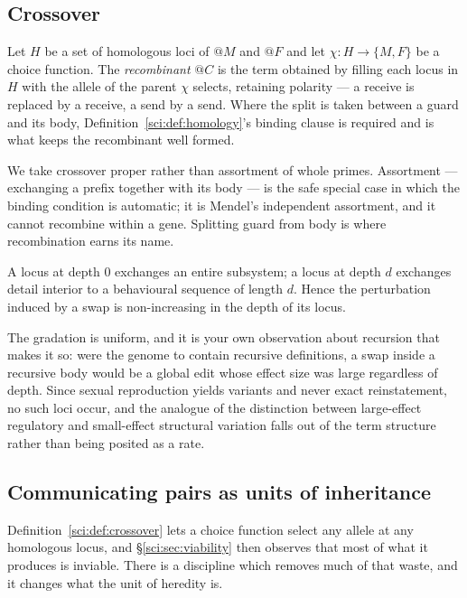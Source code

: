\subsection{Crossover}\label{sci:S12.4}

\begin{definition}[Crossover]
\label{sci:def:crossover}
Let $H$ be a set of homologous loci of $@M$ and $@F$ and let $\chi : H \to \{M, F\}$ be a choice
function. The \emph{recombinant} $@C$ is the term obtained by filling each locus in $H$ with the
allele of the parent $\chi$ selects, retaining polarity --- a receive is replaced by a receive, a send
by a send. Where the split is taken between a guard and its body, Definition~\ref{sci:def:homology}'s
binding clause is required and is what keeps the recombinant well formed.
\end{definition}

We take crossover proper rather than assortment of whole primes. Assortment --- exchanging a prefix
together with its body --- is the safe special case in which the binding condition is automatic; it is
Mendel's independent assortment, and it cannot recombine within a gene. Splitting guard from body is
where recombination earns its name.

\begin{proposition}
\label{sci:prop:depthgrade}
A locus at depth $0$ exchanges an entire subsystem; a locus at depth $d$ exchanges detail interior to
a behavioural sequence of length $d$. Hence the perturbation induced by a swap is non-increasing in
the depth of its locus.
\end{proposition}

The gradation is uniform, and it is your own observation about recursion that makes it so: were the
genome to contain recursive definitions, a swap inside a recursive body would be a global edit whose
effect size was large regardless of depth. Since sexual reproduction yields variants and never exact
reinstatement, no such loci occur, and the analogue of the distinction between large-effect regulatory
and small-effect structural variation falls out of the term structure rather than being posited as a
rate.

\subsection{Communicating pairs as units of inheritance}\label{sci:S12.5}
\label{sci:sec:pairs}

Definition~\ref{sci:def:crossover} lets a choice function select any allele at any homologous locus, and
\S\ref{sci:sec:viability} then observes that most of what it produces is inviable. There is a discipline
which removes much of that waste, and it changes what the unit of heredity is.

